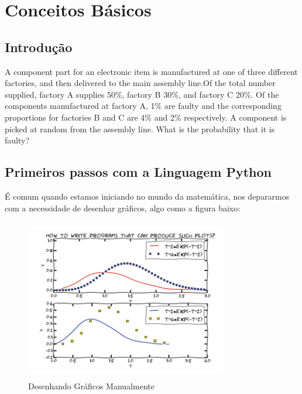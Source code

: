 


\chapter{Conceitos Básicos}


\section{Introdução}\label{intro}

A component part for an electronic item is
manufactured at one of three different factories, and then delivered to
the main assembly line.Of the total number supplied, factory A supplies
50\%, factory B 30\%, and factory C 20\%. Of the components
manufactured at factory A, 1\% are faulty and the corresponding
proportions for factories B and C are 4\% and 2\% respectively. A
component is picked at random from the assembly line. What is the
probability that it is faulty?

\section{Primeiros passos com a Linguagem Python}\label{python}

É comum quando estamos iniciando no mundo da matemática, nos depararmos com a necessidade de desenhar gráficos, algo como a figura baixo:

\begin{figure}
    \includegraphics[width=250pt, height=200pt]{chapters/chapter0/figures/manual_graph.png}
    \caption[Desenhando Gráficos Manualmente]{Desenhando Gráficos Manualmente}
\end{figure}


